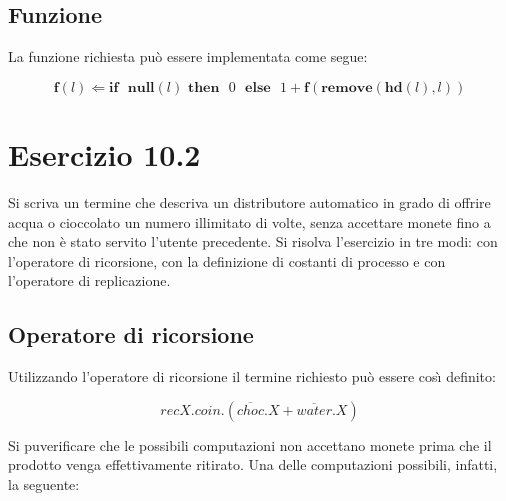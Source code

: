 		\subsection{Funzione}
		La funzione richiesta pu\`o essere implementata come segue:
		
		$$\textbf{f}(l) \Leftarrow \textbf{if}\text{ }\textbf{null}(l)\text{
		}\textbf{then}\text{ }0\text{ }\textbf{else}\text{ }1 +
		\textbf{f}(\textbf{remove}(\textbf{hd}(l),l))$$
		
		\newpage
		
	\section{Esercizio 10.2}
		Si scriva un termine che descriva un distributore automatico in grado
		di offrire acqua o cioccolato un numero illimitato di volte, senza accettare
		monete fino a che non \`e stato servito l'utente precedente. Si risolva
		l'esercizio in tre modi: con l'operatore di ricorsione, con la definizione di
		costanti di processo e con l'operatore di replicazione.
		
		\sectionline
		
		\subsection{Operatore di ricorsione}
		
		Utilizzando l'operatore di ricorsione il termine richiesto pu\`{o} essere cos\`{\i} definito:
		
		$$recX.coin.(\overline{choc}.X + \overline{water}.X)$$
		
		Si pu\oacc verificare che le possibili computazioni non accettano monete prima che il prodotto venga effettivamente ritirato. Una delle computazioni possibili, infatti, \eacc la seguente:
		

